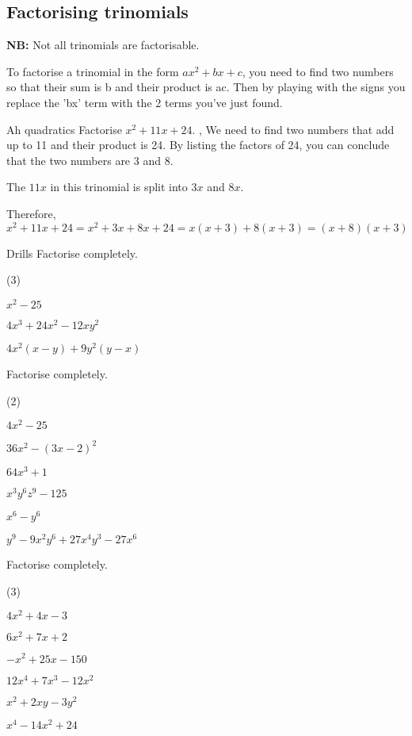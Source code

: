 \documentclass[../../main.tex]{subfiles}
\begin{document}
\subsection{Factorising trinomials}

\textbf{NB:} Not all trinomials are factorisable.

To factorise a trinomial in the form $ax^{2}+bx+c$, you need to find two numbers so that their sum is b and their product is ac. Then by playing with the signs you replace the 'bx' term with the 2 terms you've just found. %

\begin{example}{Ah quadratics}
Factorise $x^{2}+11x+24$.
\sep
We need to find two numbers that add up to 11 and their product is 24. By listing the factors of 24, you can conclude that the two numbers are 3 and 8.

The $11x$ in this trinomial is split into $3x$ and $8x$.

Therefore, $x^{2}+11x+24=x^{2}+3x+8x+24=x(x+3)+8(x+3)=(x+8)(x+3)$
\end{example}
\begin{questions}{Drills}
Factorise completely.
\begin{question_set}(3)
    \item $x^{2}-25$
    \item $4x^{3}+24x^{2}-12xy^{2}$
    \item $4x^{2}(x-y)+9y^2(y-x)$
\end{question_set}
Factorise completely.
\begin{question_set}(2)
    \item $4x^{2}-25$
    \item $36x^{2}-(3x-2)^{2}$
    \item $64x^{3}+1$
    \item $x^{3}y^{6}z^{9}-125$
    \item $x^{6}-y^{6}$
    \item $y^{9}-9x^{2}y^{6}+27x^{4}y^{3}-27x^{6}$
\end{question_set}
Factorise completely.
\begin{question_set}(3)
    \item $4x^{2}+4x-3$
    \item $6x^{2}+7x+2$
    \item $-x^{2}+25x-150$
    \item $12x^{4}+7x^{3}-12x^{2}$
    \item $x^{2}+2xy-3y^{2}$
    \item $x^{4}-14x^{2}+24$
\end{question_set}
\end{questions}
\end{document}
